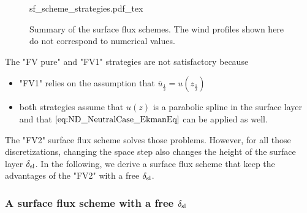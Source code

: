 \begin{figure}
	{sf_scheme_strategies.pdf_tex}
	\caption{Summary of the surface flux schemes. The
	wind profiles shown here do not correspond to
	numerical values.}
	\label{fig:ND_NeutralCase_summary_sfscheme}
\end{figure}

The "FV pure" and "FV1" strategies are not satisfactory because
\begin{itemize}
	\item "FV1" relies on the assumption that $\overline{u}_{\frac{1}{2}} = u(z_{\frac{1}{2}})$
	\item both strategies assume that $u(z)$ is a parabolic spline in the surface layer and that $\eqref{eq:ND_NeutralCase_EkmanEq}$
		can be applied as well.
\end{itemize}
The "FV2" surface flux scheme solves those problems.
However, for all those discretizations, changing the space step
also changes the height of the surface layer $\delta_{\rm sl}$.
In the following, we derive a surface flux scheme that keep
the advantages of the "FV2" with a free $\delta_{\rm sl}$.

\subsubsection{A surface flux scheme with a free $\delta_{\rm sl}$}

